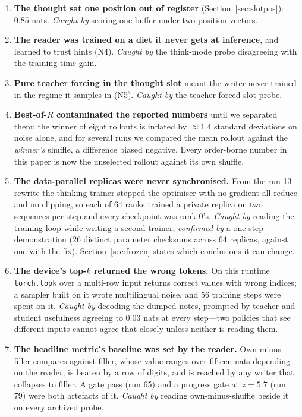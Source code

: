 \documentclass{article} %
\begin{document}
\begin{enumerate}
\item \textbf{The thought sat one position out of register} (Section~\ref{sec:slotpos}): $0.85$ nats. \emph{Caught by} scoring one buffer under two position vectors.
\item \textbf{The reader was trained on a diet it never gets at inference}, and learned to trust hints (N4). \emph{Caught by} the think-mode probe disagreeing with the training-time gain.
\item \textbf{Pure teacher forcing in the thought slot} meant the writer never trained in the regime it samples in (N5). \emph{Caught by} the teacher-forced-slot probe.
\item \textbf{Best-of-$R$ contaminated the reported numbers} until we separated them: the winner of eight rollouts is inflated by $\approx 1.4$ standard deviations on noise alone, and for several runs we compared the mean rollout against the \emph{winner's} shuffle, a difference biased negative. Every order-borne number in this paper is now the unselected rollout against its own shuffle.
\item \textbf{The data-parallel replicas were never synchronised.} From the run-13 rewrite the thinking trainer stepped the optimiser with no gradient all-reduce and no clipping, so each of $64$ ranks trained a private replica on two sequences per step and every checkpoint was rank 0's. \emph{Caught by} reading the training loop while writing a second trainer; \emph{confirmed by} a one-step demonstration ($26$ distinct parameter checksums across $64$ replicas, against one with the fix). Section~\ref{sec:frozen} states which conclusions it can change.
\item \textbf{The device's top-$k$ returned the wrong tokens.} On this runtime \texttt{torch.topk} over a multi-row input returns correct values with wrong indices; a sampler built on it wrote multilingual noise, and $56$ training steps were spent on it. \emph{Caught by} decoding the dumped notes, prompted by teacher and student usefulness agreeing to $0.03$ nats at every step---two policies that see different inputs cannot agree that closely unless neither is reading them.
\item \textbf{The headline metric's baseline was set by the reader.} Own-minus-filler compares against filler, whose value ranges over fifteen nats depending on the reader, is beaten by a row of digits, and is reached by any writer that collapses to filler. A gate pass (run 65) and a progress gate at $z = 5.7$ (run 79) were both artefacts of it. \emph{Caught by} reading own-minus-shuffle beside it on every archived probe.

\end{enumerate}
\end{document}
